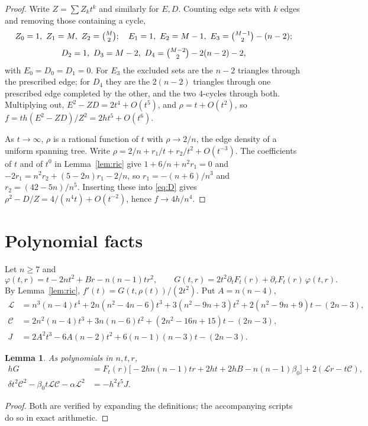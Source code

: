\documentclass[11pt]{amsart}
\newtheorem{lemma}[theorem]{Lemma}
\theoremstyle{remark}
\begin{document}
\begin{proof}
Write $Z=\sum Z_kt^k$ and similarly for $E,D$. Counting edge sets with $k$ edges and
removing those containing a cycle,
\[
Z_0=1,\ Z_1=M,\ Z_2=\tbinom M2;\quad E_1=1,\ E_2=M-1,\ E_3=\tbinom{M-1}2-(n-2);
\]
\[
D_2=1,\ D_3=M-2,\ D_4=\tbinom{M-2}2-2(n-2)-2,
\]
with $E_0=D_0=D_1=0$. For $E_3$ the excluded sets are the $n-2$ triangles through the
prescribed edge; for $D_4$ they are the $2(n-2)$ triangles through one prescribed edge
completed by the other, and the two $4$-cycles through both. Multiplying out,
$E^2-ZD=2t^4+O(t^5)$, and $\rho=t+O(t^2)$, so $f=th(E^2-ZD)/Z^2=2ht^5+O(t^6)$.

As $t\to\infty$, $\rho$ is a rational function of $t$ with $\rho\to2/n$, the edge
density of a uniform spanning tree. Write $\rho=2/n+r_1/t+r_2/t^2+O(t^{-3})$. The
coefficients of $t$ and of $t^0$ in Lemma~\ref{lem:ric} give $1+6/n+n^2r_1=0$ and
$-2r_1=n^2r_2+(5-2n)r_1-2/n$, so $r_1=-(n+6)/n^3$ and $r_2=(42-5n)/n^5$. Inserting these
into \eqref{eq:D} gives $\rho^2-D/Z=4/(n^4t)+O(t^{-2})$, hence $f\to4h/n^4$.
\end{proof}

\section{Polynomial facts}\label{sec:poly}

Let $n\ge7$ and
\[
\varphi(t,r)=t-2nt^2+Br-n(n-1)tr^2,\qquad G(t,r)=2t^2\partial_tF_t(r)+\partial_rF_t(r)\,\varphi(t,r).
\]
By Lemma~\ref{lem:ric}, $f'(t)=G(t,\rho(t))/(2t^2)$. Put $A=n(n-4)$,
\begin{align*}
\mathcal L&=n^3(n-4)t^4+2n(n^2-4n-6)t^3+3(n^2-9n+3)t^2+2(n^2-9n+9)t-(2n-3),\\
\mathcal C&=2n^2(n-4)t^3+3n(n-6)t^2+(2n^2-16n+15)t-(2n-3),\\
J&=2A^2t^3-6A(n-2)t^2+6(n-1)(n-3)t-(2n-3).
\end{align*}

\begin{lemma}\label{lem:ids}
As polynomials in $n,t,r$,
\begin{align}
hG&=F_t(r)\bigl[-2hn(n-1)tr+2ht+2hB-n(n-1)\beta_0\bigr]+2(\mathcal Lr-t\mathcal C),\label{eq:id1}\\
\delta t^2\mathcal C^2-\beta_0t\mathcal L\mathcal C-\alpha\mathcal L^2&=-h^2t^5J.\label{eq:id2}
\end{align}
\end{lemma}

\begin{proof}
Both are verified by expanding the definitions; the accompanying scripts do so in exact
arithmetic.
\end{proof}
\end{document}
